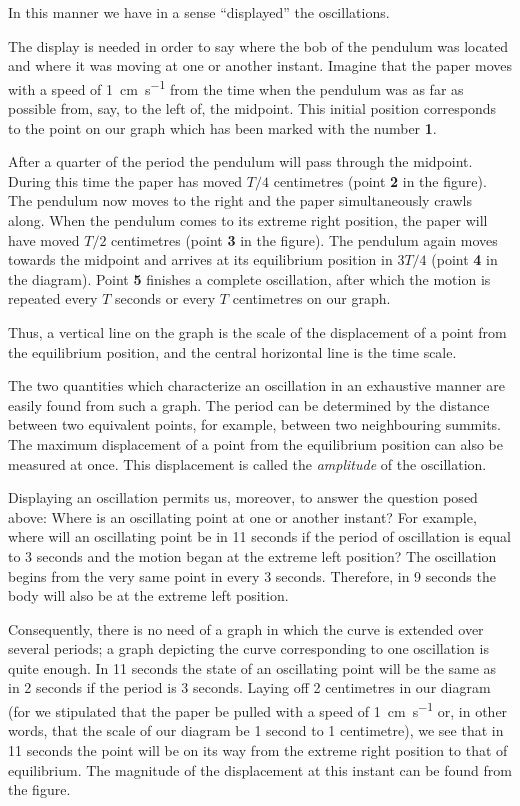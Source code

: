 In this manner we have in a sense ``displayed'' the
oscillations.

The display is needed in order to say where the bob of
the pendulum was located and where it was moving at
one or another instant. Imagine that the paper moves
with a speed of \SI{1}{\centi\meter\per\second} from the time when the pendulum was as far as possible from, say, to the left of, the midpoint. This initial position corresponds to the point on our graph which has been marked with the number \textbf{1}.

After a quarter of the period the pendulum will pass
through the midpoint. During this time the paper has
moved $T/4$ centimetres (point \textbf{2} in the figure). The pendulum now moves to the right and the paper simultaneously crawls along. When the pendulum comes to its extreme right position, the paper will have moved $T/2$ centimetres (point \textbf{3} in the figure). The pendulum again moves towards the midpoint and arrives at its equilibrium position in $3T/4$ (point \textbf{4} in the diagram). Point \textbf{5} finishes a complete oscillation, after which the motion is repeated every $T$ seconds or every $T$ centimetres on our graph.

Thus, a vertical line on the graph is the scale of the
displacement of a point from the equilibrium position,
and the central horizontal line is the time scale.

The two quantities which characterize an oscillation
in an exhaustive manner are easily found from such
a graph. The period can be determined by the distance
between two equivalent points, for example, between
two neighbouring summits. The maximum displacement
of a point from the equilibrium position can also be
measured at once. This displacement is called the \emph{amplitude} of the oscillation.

Displaying an oscillation permits us, moreover, to
answer the question posed above: Where is an oscillating
point at one or another instant? For example, where will
an oscillating point be in 11 seconds if the period of
oscillation is equal to 3 seconds and the motion began
at the extreme left position? The oscillation begins from
the very same point in every 3 seconds. Therefore, in
9 seconds the body will also be at the extreme left position.

Consequently, there is no need of a graph in which the
curve is extended over several periods; a graph depicting
the curve corresponding to one oscillation is quite enough.
In 11 seconds the state of an oscillating point will be
the same as in 2 seconds if the period is 3 seconds. Laying
off 2 centimetres in our diagram (for we stipulated that
the paper be pulled with a speed of  \SI{1}{\centi\meter\per\second} or, in other words, that the scale of our diagram be 1 second to 1 centimetre), we see that in 11 seconds the point will be on 	its way from the extreme right position to that of equilibrium. The magnitude of the displacement at this instant can be found from the figure.


